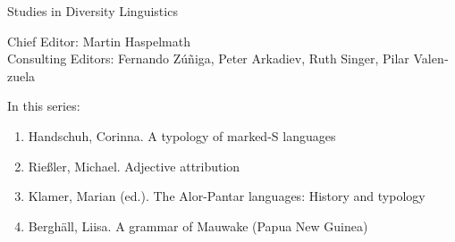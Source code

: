 
{\large Studies in Diversity Linguistics}

\bigskip

Chief Editor: Martin Haspelmath \\
Consulting Editors: Fernando Zúñiga, Peter Arkadiev, Ruth Singer, Pilar Valen­zuela

\bigskip

In this series:

\begin{enumerate}
\item Handschuh, Corinna. A typology of marked-S languages
\item Rießler, Michael. Adjective attribution
\item Klamer, Marian (ed.). The Alor-Pantar languages: History and typology
\item Berghäll, Liisa. A grammar of Mauwake (Papua New Guinea)
\end{enumerate}


